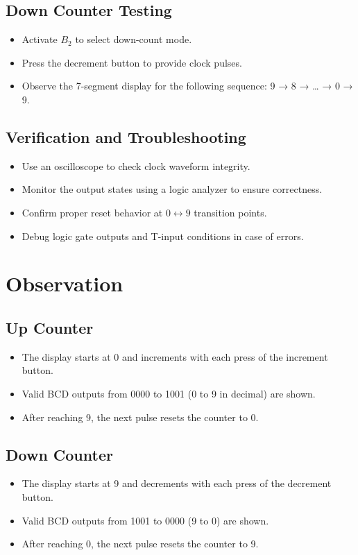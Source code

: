 \documentclass[12pt]{article}
\begin{document}
\subsection*{Down Counter Testing}
\begin{itemize}
    \item Activate $B_2$ to select down-count mode.
    \item Press the decrement button to provide clock pulses.
    \item Observe the 7-segment display for the following sequence: 9 → 8 → … → 0 → 9.
\end{itemize}

\subsection*{Verification and Troubleshooting}
\begin{itemize}
    \item Use an oscilloscope to check clock waveform integrity.
    \item Monitor the output states using a logic analyzer to ensure correctness.
    \item Confirm proper reset behavior at $0 \leftrightarrow 9$ transition points.
    \item Debug logic gate outputs and T-input conditions in case of errors.
\end{itemize}

\section*{Observation}

\subsection*{Up Counter}
\begin{itemize}
    \item The display starts at 0 and increments with each press of the increment button.
    \item Valid BCD outputs from 0000 to 1001 (0 to 9 in decimal) are shown.
    \item After reaching 9, the next pulse resets the counter to 0.
\end{itemize}

\subsection*{Down Counter}
\begin{itemize}
    \item The display starts at 9 and decrements with each press of the decrement button.
    \item Valid BCD outputs from 1001 to 0000 (9 to 0) are shown.
    \item After reaching 0, the next pulse resets the counter to 9.
\end{itemize}
\end{document}
